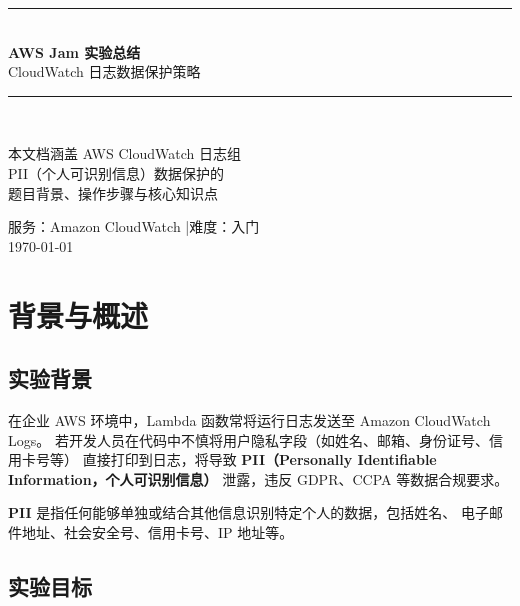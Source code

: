 \documentclass[12pt, a4paper]{article}
\begin{document}
\begin{titlepage}
  \centering
  \vspace*{2cm}
  {\color{awsorange}\rule{\linewidth}{4pt}}\\[0.4cm]
  {\Huge\bfseries\color{awsdark} AWS Jam 实验总结}\\[0.3cm]
  {\Large\color{gray} CloudWatch 日志数据保护策略}\\[0.2cm]
  {\color{awsorange}\rule{\linewidth}{4pt}}\\[1.5cm]

  \begin{tcolorbox}[colback=awsdark, colframe=awsdark, width=0.85\linewidth]
    \centering\color{white}\large
    本文档涵盖 AWS CloudWatch 日志组\\
    PII（个人可识别信息）数据保护的\\
    题目背景、操作步骤与核心知识点
  \end{tcolorbox}

  \vfill
  {\large 服务：Amazon CloudWatch \quad|\quad 难度：入门}\\[0.3cm]
  {\color{gray}\today}
\end{titlepage}

\tableofcontents
\newpage

\section{背景与概述}

\subsection{实验背景}

在企业 AWS 环境中，Lambda 函数常将运行日志发送至 Amazon CloudWatch Logs。
若开发人员在代码中不慎将用户隐私字段（如姓名、邮箱、身份证号、信用卡号等）
直接打印到日志，将导致 \textbf{PII（Personally Identifiable Information，个人可识别信息）}
泄露，违反 GDPR、CCPA 等数据合规要求。

\begin{notebox}
  \textbf{PII} 是指任何能够单独或结合其他信息识别特定个人的数据，包括姓名、
  电子邮件地址、社会安全号、信用卡号、IP 地址等。
\end{notebox}

\subsection{实验目标}
\end{document}
